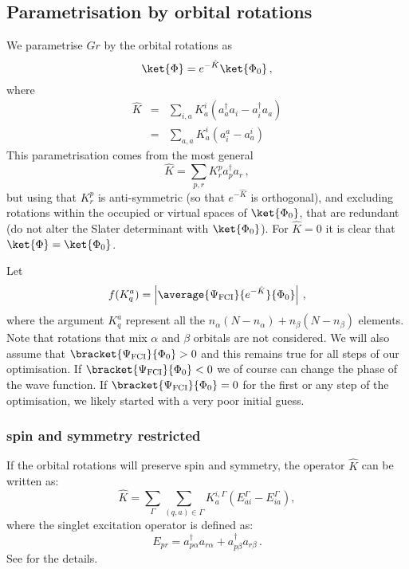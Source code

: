 \documentclass[a4paper,11pt]{article}
\newcommand{\irp}{\ensuremath{\Gamma}}
\begin{document}
\subsection{Parametrisation by orbital rotations}
We parametrise $Gr$ by the orbital rotations as\cite{}
\begin{equation}
  \ket{\Phi} = e^{-\hat{K}} \ket{\Phi_0}\,,
\end{equation}
where
\begin{eqnarray}
  \hat{K} &=& \sum_{i,a} K_a^i(a_a^\dagger a_i - a_i^\dagger a_a)\\
          &=& \sum_{a,a} K_a^i(a_i^a - a_a^i)\,
\end{eqnarray}
This parametrisation comes from the most general 
\begin{equation}
  \hat{K} = \sum_{p,r} K_r^pa_p^\dagger a_r\,,
\end{equation}
but using that $K_r^p$ is anti-symmetric (so that $e^{-\hat{K}}$ is orthogonal), and excluding rotations within the occupied or virtual spaces of $\ket{\Phi_0}$, that are redundant (do not alter the Slater determinant with $\ket{\Phi_0}$).
For $\hat{K} = 0$ it is clear that $\ket{\Phi} = \ket{\Phi_0}$.

Let
\begin{equation}
  f(K_q^a) = \left|\average{\Psi_\text{FCI}}{e^{-\hat{K}}}{\Phi_0}\right|\,,
\end{equation}
where the argument $K_q^a$ represent all the $n_\alpha(N-n_\alpha) + n_\beta(N-n_\beta)$ elements.
Note that rotations that mix $\alpha$ and $\beta$ orbitals are not considered.
We will also assume that $\bracket{\Psi_\text{FCI}}{\Phi_0} > 0$ and this remains true for all steps
of our optimisation.
If $\bracket{\Psi_\text{FCI}}{\Phi_0} < 0$ we of course can change the phase of the wave function.
If $\bracket{\Psi_\text{FCI}}{\Phi_0} = 0$ for the first or any step of the optimisation, we likely started with a very poor initial guess.

\subsubsection{spin and symmetry restricted}

If the orbital rotations will preserve spin and symmetry, the operator $\hat{K}$ can be written as:
\begin{equation}
  \hat{K} = \sum_\irp \sum_{(q,a) \in \irp} K_a^{i,\irp}(E_{ai}^\irp - E_{ia}^\irp),
\end{equation}
where the singlet excitation operator is defined as:
\begin{equation}
  E_{pr} = a_{p\alpha}^\dagger a_{r\alpha} + a_{p\beta}^\dagger a_{r\beta}\,.
\end{equation}
See \cite{helgaker00_molec} for the details.
\end{document}
